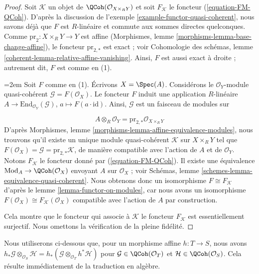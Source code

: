 \begin{proof}
Soit $\mathcal{K}$ un objet de $\QCoh(\mathcal{O}_{X \times_R Y})$
et soit $F_\mathcal{K}$ le foncteur (\ref{equation-FM-QCoh}). D'après la discussion de
l'exemple \ref{example-functor-quasi-coherent}, nous savons déjà que
$F$ est $R$-linéaire et commute aux sommes directes quelconques.
Comme $\text{pr}_2 : X \times_R Y \to Y$ est affine
(Morphismes, lemme \ref{morphisms-lemma-base-change-affine}), le foncteur
$\text{pr}_{2, *}$ est exact ; voir Cohomologie des schémas, lemme
\ref{coherent-lemma-relative-affine-vanishing}.
Ainsi, $F$ est aussi exact à droite ; autrement dit, $F$ est comme en (1).

\medskip\noindent
\begingroup\emergencystretch=2em
Soit $F$ comme en (1). Écrivons $X = \Spec(A)$. Considérons le
$\mathcal{O}_Y$-module quasi-cohérent $\mathcal{G} = F(\mathcal{O}_X)$.
Le foncteur $F$ induit une application $R$-linéaire
$A \to \text{End}_{\mathcal{O}_Y}(\mathcal{G})$,
$a \mapsto F(a \cdot \text{id})$. Ainsi, $\mathcal{G}$ est un faisceau de modules sur\par\endgroup
$$
A \otimes_R \mathcal{O}_Y = \text{pr}_{2, *}\mathcal{O}_{X \times_R Y}
$$
D'après Morphismes, lemme \ref{morphisms-lemma-affine-equivalence-modules},
nous trouvons qu'il existe un unique module quasi-cohérent $\mathcal{K}$
sur $X \times_R Y$ tel que $F(\mathcal{O}_X) = \mathcal{G} =
\text{pr}_{2, *}\mathcal{K}$, de manière compatible avec l'action
de $A$ et de $\mathcal{O}_Y$. Notons $F_\mathcal{K}$ le foncteur
donné par (\ref{equation-FM-QCoh}). Il existe une équivalence
$\text{Mod}_A \to \QCoh(\mathcal{O}_X)$ envoyant $A$ sur $\mathcal{O}_X$ ; voir
Schémas, lemme \ref{schemes-lemma-equivalence-quasi-coherent}.
Nous obtenons donc un isomorphisme $F \cong F_\mathcal{K}$ d'après le
lemme \ref{lemma-functor-on-modules}, car nous avons un isomorphisme
$F(\mathcal{O}_X) \cong F_\mathcal{K}(\mathcal{O}_X)$ compatible avec
l'action de $A$ par construction.

\medskip\noindent
Cela montre que le foncteur qui associe à $\mathcal{K}$ le foncteur $F_\mathcal{K}$
est essentiellement surjectif. Nous omettons la vérification de la pleine fidélité.
\end{proof}

\begin{remark}
\label{remark-affine-morphism}
Nous utiliserons ci-dessous que, pour un morphisme affine
$h : T \to S$, nous avons $h_*\mathcal{G} \otimes_{\mathcal{O}_S} \mathcal{H} =
h_*(\mathcal{G} \otimes_{\mathcal{O}_T} h^*\mathcal{H})$ pour
$\mathcal{G} \in \QCoh(\mathcal{O}_T)$ et
$\mathcal{H} \in \QCoh(\mathcal{O}_S)$. Cela résulte
immédiatement de la traduction en algèbre.
\end{remark}

